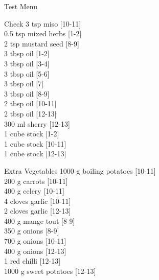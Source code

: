 \begin{menu}{Test Menu}
\begin{shoppinglist}{Check}
      3 tsp miso 
        {\scriptsize[10-11]}\\
      0.5 tsp mixed herbs 
        {\scriptsize[1-2]}\\
      2 tsp mustard seed 
        {\scriptsize[8-9]}\\
      3 tbsp oil 
        {\scriptsize[1-2]}\\
      3 tbsp oil 
        {\scriptsize[3-4]}\\
      3 tbsp oil 
        {\scriptsize[5-6]}\\
      3 tbsp oil 
        {\scriptsize[7]}\\
      3 tbsp oil 
        {\scriptsize[8-9]}\\
      2 tbsp oil 
        {\scriptsize[10-11]}\\
      2 tbsp oil 
        {\scriptsize[12-13]}\\
      300 ml sherry 
        {\scriptsize[12-13]}\\
      1 cube stock 
        {\scriptsize[1-2]}\\
      1 cube stock 
        {\scriptsize[10-11]}\\
      1 cube stock 
        {\scriptsize[12-13]}\\
      \end{shoppinglist}%
      \begin{shoppinglist}{Extra Vegetables}
      1000 g boiling potatoes 
        {\scriptsize[10-11]}\\
      200 g carrots 
        {\scriptsize[10-11]}\\
      400 g celery 
        {\scriptsize[10-11]}\\
      4 cloves garlic 
        {\scriptsize[10-11]}\\
      2 cloves garlic 
        {\scriptsize[12-13]}\\
      400 g mange tout 
        {\scriptsize[8-9]}\\
      350 g onions 
        {\scriptsize[8-9]}\\
      700 g onions 
        {\scriptsize[10-11]}\\
      400 g onions 
        {\scriptsize[12-13]}\\
      1  red chilli 
        {\scriptsize[12-13]}\\
      1000 g sweet potatoes 
        {\scriptsize[12-13]}\\
      \end{shoppinglist}%
      \par\vfil %
    \vfil\clearpage
  

\end{menu}

